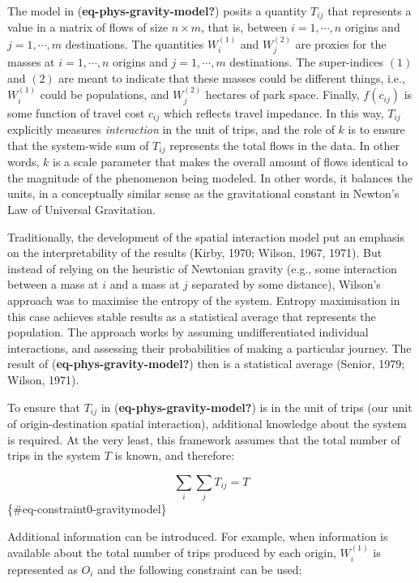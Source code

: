 \documentclass[
11pt, %
oneside, %
english, %
singlespacing, %
]{macthesis} %
\begin{document}
The model in (\textbf{eq-phys-gravity-model?}) posits a quantity \(T_{ij}\) that represents a value in a matrix of flows of size \(n \times m\), that is, between \(i = 1,\cdots, n\) origins and \(j = 1,\cdots, m\) destinations. The quantities \(W_i^{(1)}\) and \(W_j^{(2)}\) are proxies for the masses at \(i=1,\cdots,n\) origins and \(j=1,\cdots,m\) destinations. The super-indices \((1)\) and \((2)\) are meant to indicate that these masses could be different things, i.e., \(W_i^{(1)}\) could be populations, and \(W_j^{(2)}\) hectares of park space. Finally, \(f(c_{ij})\) is some function of travel cost \(c_{ij}\) which reflects travel impedance. In this way, \(T_{ij}\) explicitly measures \emph{interaction} in the unit of trips, and the role of \(k\) is to ensure that the system-wide sum of \(T_{ij}\) represents the total flows in the data. In other words, \(k\) is a scale parameter that makes the overall amount of flows identical to the magnitude of the phenomenon being modeled. In other words, it balances the units, in a conceptually similar sense as the gravitational constant in Newton's Law of Universal Gravitation.

Traditionally, the development of the spatial interaction model put an emphasis on the interpretability of the results (Kirby, 1970; Wilson, 1967, 1971). But instead of relying on the heuristic of Newtonian gravity (e.g., some interaction between a mass at \(i\) and a mass at \(j\) separated by some distance), Wilson's approach was to maximise the entropy of the system. Entropy maximisation in this case achieves stable results as a statistical average that represents the population. The approach works by assuming undifferentiated individual interactions, and assessing their probabilities of making a particular journey. The result of (\textbf{eq-phys-gravity-model?}) then is a statistical average (Senior, 1979; Wilson, 1971).

To ensure that \(T_{ij}\) in (\textbf{eq-phys-gravity-model?}) is in the unit of trips (our unit of origin-destination spatial interaction), additional knowledge about the system is required. At the very least, this framework assumes that the total number of trips in the system \(T\) is known, and therefore:

\[
\sum_i\sum_j T_{ij} = T
\] \{\#eq-constraint0-gravitymodel\}

Additional information can be introduced. For example, when information is available about the total number of trips produced by each origin, \(W_i^{(1)}\) is represented as \(O_i\) and the following constraint can be used:
\end{document}
